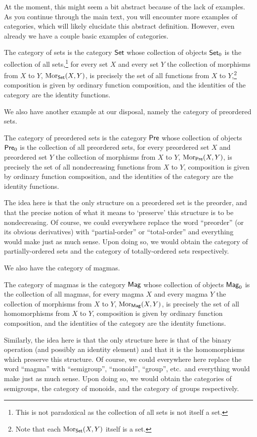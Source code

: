 At the moment, this might seem a bit abstract because of the lack of examples.  As you continue through the main text, you will encounter more examples of categories, which will likely elucidate this abstract definition.  However, even already we have a couple basic examples of categories.
\begin{exm}\label{exm1.2.2}
The category of sets is the category $\Set$\index[notation]{$\Set$} whose collection of objects $\mathsf{Set} _0$ is the collection of all sets,\footnote{This is not paradoxical as the collection of all sets is not itself a set.} for every set $X$ and every set $Y$ the collection of morphisms from $X$ to $Y$, $\operatorname{Mor} _{\mathsf{Set}}(X,Y)$, is precisely the set of all functions from $X$ to $Y$,\footnote{Note that each $\operatorname{Mor} _{\mathsf{Set}}(X,Y)$ itself is a set.} composition is given by ordinary function composition, and the identities of the category are the identity functions.
\end{exm}
We also have another example at our disposal, namely the category of preordered sets.
\begin{exm}
The category of preordered sets is the category $\Pre$\index[notation]{$\Pre$} whose collection of objects $\mathsf{Pre} _0$ is the collection of all preordered sets, for every preordered set $X$ and preordered set $Y$ the collection of morphisms from $X$ to $Y$, $\operatorname{Mor} _{\mathsf{Pre}}(X,Y)$, is precisely the set of all nondecreasing functions from $X$ to $Y$, composition is given by ordinary function composition, and the identities of the category are the identity functions.
\end{exm}
The idea here is that the only structure on a preordered set is the preorder, and that the precise notion of what it means to `preserve' this structure is to be nondecreasing.  Of course, we could everywhere replace the word ``preorder'' (or its obvious derivatives) with ``partial-order'' or ``total-order'' and everything would make just as much sense.  Upon doing so, we would obtain the category of partially-ordered sets and the category of totally-ordered sets respectively.

We also have the category of magmas.
\begin{exm}
The category of magmas is the category $\Mag$\index[notation]{$\Mag$} whose collection of objects $\mathsf{Mag} _0$ is the collection of all magmas, for every magma $X$ and every magma $Y$ the collection of morphisms from $X$ to $Y$, $\operatorname{Mor} _{\mathsf{Mag}}(X,Y)$, is precisely the set of all homomorphisms from $X$ to $Y$, composition is given by ordinary function composition, and the identities of the category are the identity functions.
\end{exm}
Similarly, the idea here is that the only structure here is that of the binary operation (and possibly an identity element) and that it is the homomorphisms which preserve this structure.  Of course, we could everywhere here replace the word ``magma'' with ``semigroup'', ``monoid'', ``group'', etc.~and everything would make just as much sense.  Upon doing so, we would obtain the categories of semigroups, the category of monoids, and the category of groups respectively.

